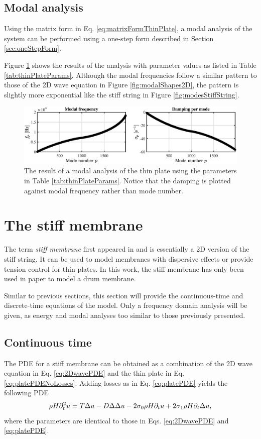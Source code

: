 {\subsection{Modal analysis}
Using the matrix form in Eq. \eqref{eq:matrixFormThinPlate}, a modal analysis of the system can be performed using a one-step form described in Section \ref{sec:oneStepForm}.

Figure \ref{fig:thinPlateModes} shows the results of the analysis with parameter values as listed in Table \ref{tab:thinPlateParams}. Although the modal frequencies follow a similar pattern to those of the 2D wave equation in Figure \ref{fig:modalShapes2D}, the pattern is slightly more exponential like the stiff string in Figure \ref{fig:modesStiffString}. 

\begin{figure}[h]
    \centering
    \includegraphics[width=\textwidth]{figures/resonators/2d/thinPlateModes.eps}
    \caption{The result of a modal analysis of the thin plate using the parameters in Table \ref{tab:thinPlateParams}. Notice that the damping is plotted against modal frequency rather than mode number. \label{fig:thinPlateModes}}
\end{figure}

\section{The stiff membrane}
The term \textit{stiff membrane} first appeared in \cite{Fletcher1998} and is essentially a 2D version of the stiff string. It can be used to model membranes with dispersive effects or provide tension control for thin plates. In this work, the stiff membrane has only been used in paper \citeP[F] to model a drum membrane. 

Similar to previous sections, this section will provide the continuous-time and discrete-time equations of the model. Only a frequency domain analysis will be given, as energy and modal analyses too similar to those previously presented.

\subsection{Continuous time}
The PDE for a stiff membrane can be obtained as a combination of the 2D wave equation in Eq. \eqref{eq:2DwavePDE} and the thin plate in Eq. \eqref{eq:platePDENoLosses}. Adding losses as in Eq. \eqref{eq:platePDE} yields the following PDE
\begin{equation}\label{eq:stiffMembranePDE}
    \rho H \partial_t^2 u = T\Delta u - D
    \Delta\Delta u- 2\sigma_{0} \rho H \partial_t u + 2 \sigma_{1}\rho H  \partial_t \Delta u,
\end{equation}
where the parameters are identical to those in Eqs. \eqref{eq:2DwavePDE} and \eqref{eq:platePDE}.

}
